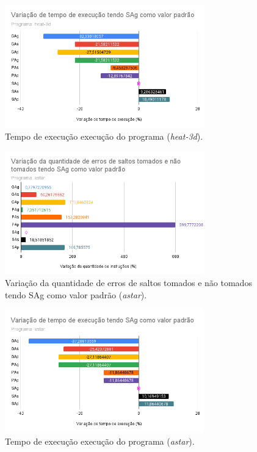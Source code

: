 \documentclass[journal, twoside]{IEEEtran}
\begin{document}
\begin{figure}[H]
    \centering
    \captionsetup{justification=centering}
    \includegraphics[width=3.4in]{figure/tempo_de_exec_(heat-3d).png}
    \caption{Tempo de execução execução do programa (\textit{heat-3d}).}
    \label{fig:tempo-heat}
\end{figure}

\begin{figure}[H]
    \centering
    \captionsetup{justification=centering}
    \includegraphics[width=3.4in]{figure/saltos_(astar).png}
    \caption{Variação da quantidade de erros de saltos tomados e não tomados tendo SAg como valor padrão (\textit{astar}).}
    \label{fig:saltos}
\end{figure}

\begin{figure}[H]
    \centering
    \captionsetup{justification=centering}
    \includegraphics[width=3.4in]{figure/tempo_de_exec_(astar).png}
    \caption{Tempo de execução execução do programa (\textit{astar}).}
    \label{fig:tempo-astar}
\end{figure}
\end{document}
